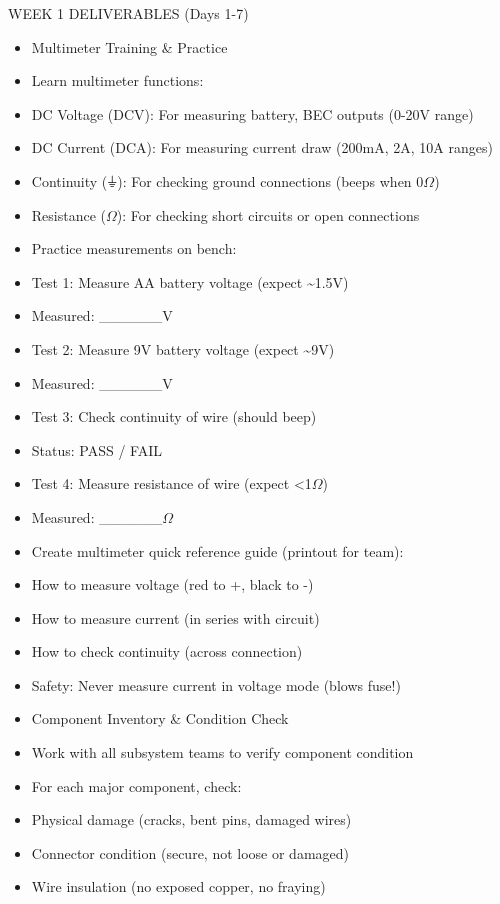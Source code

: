 \documentclass[11pt,letterpaper]{article}
\begin{document}
WEEK 1 DELIVERABLES (Days 1-7)\par

\begin{itemize}
  \item Multimeter Training \& Practice
  \item Learn multimeter functions:
  \item DC Voltage (DCV): For measuring battery, BEC outputs (0-20V range)
  \item DC Current (DCA): For measuring current draw (200mA, 2A, 10A ranges)
  \item Continuity (⏚): For checking ground connections (beeps when 0$\Omega$)
  \item Resistance ($\Omega$): For checking short circuits or open connections
\end{itemize}

\begin{itemize}
  \item Practice measurements on bench:
  \item Test 1: Measure AA battery voltage (expect \textasciitilde{}1.5V)
  \item Measured: \_\_\_\_\_\_V
  \item Test 2: Measure 9V battery voltage (expect \textasciitilde{}9V)
  \item Measured: \_\_\_\_\_\_V
  \item Test 3: Check continuity of wire (should beep)
  \item Status: PASS / FAIL
  \item Test 4: Measure resistance of wire (expect <1$\Omega$)
  \item Measured: \_\_\_\_\_\_$\Omega$
\end{itemize}

\begin{itemize}
  \item Create multimeter quick reference guide (printout for team):
  \item How to measure voltage (red to +, black to -)
  \item How to measure current (in series with circuit)
  \item How to check continuity (across connection)
  \item Safety: Never measure current in voltage mode (blows fuse!)
\end{itemize}

\begin{itemize}
  \item Component Inventory \& Condition Check
  \item Work with all subsystem teams to verify component condition
  \item For each major component, check:
  \item Physical damage (cracks, bent pins, damaged wires)
  \item Connector condition (secure, not loose or damaged)
  \item Wire insulation (no exposed copper, no fraying)
\end{itemize}
\end{document}
